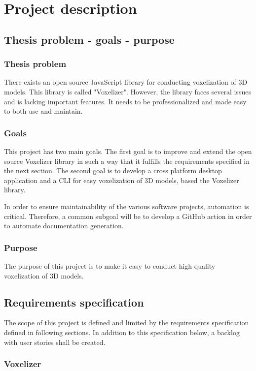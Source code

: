 \chapter{Project description}

\section{Thesis problem - goals - purpose}
\subsection{Thesis problem}
There exists an open source JavaScript library for conducting voxelization of 3D models. This library is called "Voxelizer". However, the library faces several issues and is lacking important features. It needs to be professionalized and made easy to both use and maintain.

\subsection{Goals}
This project has two main goals. The first goal is to improve and extend the open source Voxelizer library in such a way that it fulfills the requirements specified in the next section. The second goal is to develop a cross platform desktop application and a CLI for easy voxelization of 3D models, based the Voxelizer library.

In order to ensure maintainability of the various software projects, automation is critical. Therefore, a common subgoal will be to develop a GitHub action in order to automate documentation generation.

\subsection{Purpose}
The purpose of this project is to make it easy to conduct high quality voxelization of 3D models.

\section{Requirements specification}
The scope of this project is defined and limited by the requirements specification defined in following sections. In addition to this specification below, a backlog with user stories shall be created.

\subsection{Voxelizer}
